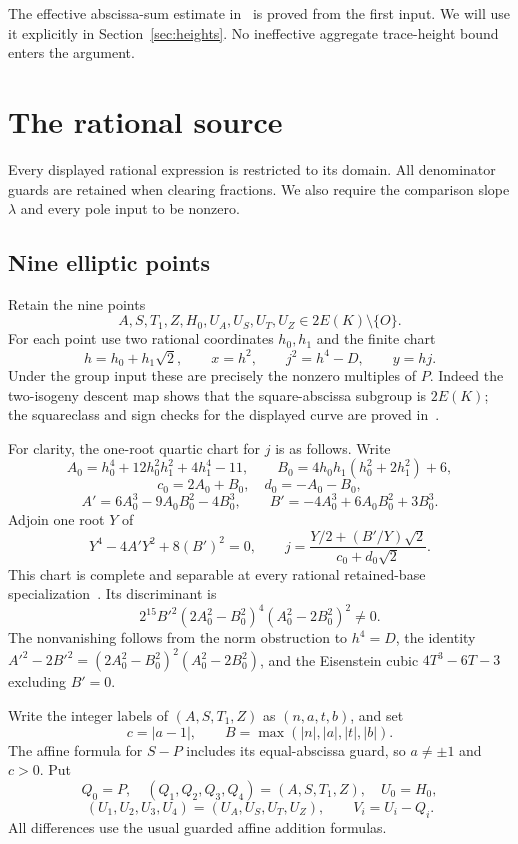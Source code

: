 \documentclass[11pt,a4paper]{article}
\begin{document}
The effective abscissa-sum estimate in~\cite{Sums} is proved from the
first input. We will use it explicitly in Section~\ref{sec:heights}.
No ineffective aggregate trace-height bound enters the argument.

\section{The rational source}

Every displayed rational expression is restricted to its domain.
All denominator guards are retained when clearing fractions. We also
require the comparison slope $\lambda$ and every pole input to be
nonzero.

\subsection{Nine elliptic points}

Retain the nine points
\[
 A,S,T_1,Z,H_0,U_A,U_S,U_T,U_Z\in2E(K)\setminus\{O\}.
\]
For each point use two rational coordinates $h_0,h_1$ and the finite
chart
\[
 h=h_0+h_1\sqrt2,\qquad x=h^2,\qquad j^2=h^4-D,\qquad y=hj.
\]
Under the group input these are precisely the nonzero multiples of
$P$. Indeed the two-isogeny descent map shows that the square-abscissa
subgroup is $2E(K)$; the squareclass and sign checks for the displayed
curve are proved in~\cite{SquareCharts}.

For clarity, the one-root quartic chart for $j$ is as follows. Write
\[
 A_0=h_0^4+12h_0^2h_1^2+4h_1^4-11,\qquad
 B_0=4h_0h_1(h_0^2+2h_1^2)+6,
\]
\[
 c_0=2A_0+B_0,\quad d_0=-A_0-B_0,
\]
\[
 A'=6A_0^3-9A_0B_0^2-4B_0^3,\qquad
 B'=-4A_0^3+6A_0B_0^2+3B_0^3.
\]
Adjoin one root $Y$ of
\begin{equation}\label{eq:pointquartic}
 Y^4-4A'Y^2+8(B')^2=0,\qquad
 j=\frac{Y/2+(B'/Y)\sqrt2}{c_0+d_0\sqrt2}.
\end{equation}
This chart is complete and separable at every rational retained-base
specialization~\cite{QuadraticCharts,SquarePredicate}. Its discriminant is
\[
 2^{15}B'^2(2A_0^2-B_0^2)^4(A_0^2-2B_0^2)^2\ne0.
\]
The nonvanishing follows from the norm obstruction to $h^4=D$,
the identity
$A'^2-2B'^2=(2A_0^2-B_0^2)^2(A_0^2-2B_0^2)$,
and the Eisenstein cubic $4T^3-6T-3$ excluding $B'=0$.

Write the integer labels of $(A,S,T_1,Z)$ as $(n,a,t,b)$, and set
\[
 c=|a-1|,\qquad B=\max(|n|,|a|,|t|,|b|).
\]
The affine formula for $S-P$ includes its equal-abscissa guard, so
$a\ne\pm1$ and $c>0$. Put
\[
 Q_0=P,\quad (Q_1,Q_2,Q_3,Q_4)=(A,S,T_1,Z),\quad U_0=H_0,
\]
\[
 (U_1,U_2,U_3,U_4)=(U_A,U_S,U_T,U_Z),\qquad V_i=U_i-Q_i.
\]
All differences use the usual guarded affine addition formulas.
\end{document}
